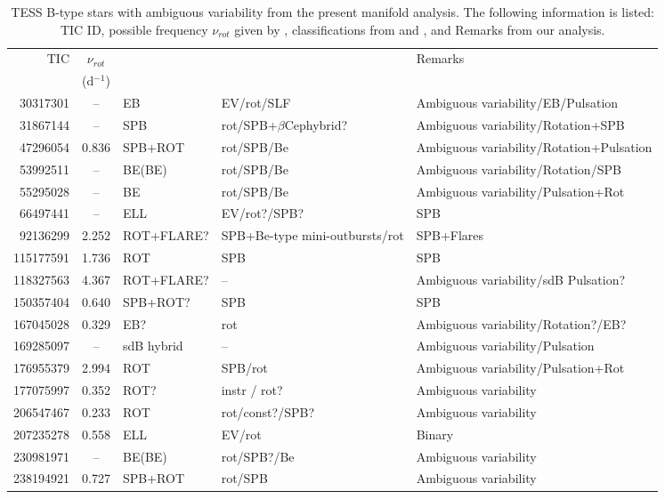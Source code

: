 \documentclass[RNAAS]{aastex63}
\begin{document}
\begin{table}[h]
    \centering
   \caption{\label{TABLE 4} TESS B-type stars with ambiguous variability from the present manifold analysis. The following information is listed: TIC ID, possible frequency $\nu_{rot}$ given by \citet{Balona2019}, classifications from \citet{Balona2019} and \citet{Pedersen2019}, and Remarks from our analysis.}
    \begin{tabular}{rclll}
        \hline \hline
TIC      	&	 $\nu_{rot}$   & \citet{Balona2019}	&	 \citet{Pedersen2019}	&	Remarks	\\
 	&	  (d$^{-1}$) 	&	 &	&	               	\\
\hline							
30317301	&	--	&EB&	EV/rot/SLF	&	Ambiguous variability/EB/Pulsation	\\
31867144	&	--	&SPB&	rot/SPB+$\beta$Cephybrid?	&	Ambiguous variability/Rotation+SPB	\\
47296054	&	0.836	& SPB+ROT&	rot/SPB/Be	&	Ambiguous variability/Rotation+Pulsation	\\
53992511	&	--	& BE(BE)&	rot/SPB/Be	&	Ambiguous variability/Rotation/SPB	\\
55295028	&	--	&BE&	rot/SPB/Be	&	Ambiguous variability/Pulsation+Rot	\\
66497441	&	--		& ELL&	EV/rot?/SPB?	&	SPB	\\
92136299	&	2.252	& ROT+FLARE?&	SPB+Be-type mini-outbursts/rot	&	SPB+Flares\\
115177591	&	1.736	& 	ROT&SPB 	&	SPB   	\\
118327563	&	4.367	& ROT+FLARE?&	--  	&	Ambiguous variability/sdB Pulsation?   	\\
150357404	&	0.640	& SPB+ROT?&	SPB 	&	SPB   	\\
167045028	&	0.329	& EB?&	rot	&	Ambiguous variability/Rotation?/EB?	\\
169285097	&	--	& sdB hybrid&	--	&		Ambiguous variability/Pulsation\\
176955379	&	2.994	& ROT&	SPB/rot   	&	Ambiguous variability/Pulsation+Rot   	\\
177075997	&	0.352	& ROT?&	instr / rot?	&	Ambiguous variability	\\
206547467	&	0.233	& ROT&	rot/const?/SPB? 	&	Ambiguous variability   	\\
207235278	&	0.558	& ELL&	EV/rot    	&	Binary  	\\
230981971	&	--	& BE(BE)&	rot/SPB?/Be	&	Ambiguous variability	\\
238194921	&	0.727	& SPB+ROT&	rot/SPB   	&	Ambiguous variability 	\\

\end{tabular}
\end{table}
\end{document}
